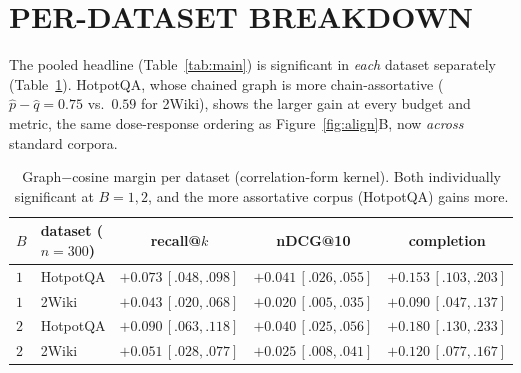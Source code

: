 \documentclass[twoside]{article}
\theoremstyle{plain}
\theoremstyle{definition}
\begin{document}
\section{PER-DATASET BREAKDOWN}\label{app:perds}
The pooled headline (Table~\ref{tab:main}) is significant in \emph{each} dataset separately (Table~\ref{tab:perds}).
HotpotQA, whose chained graph is more chain-assortative ($\hat p-\hat q=0.75$ vs.\ $0.59$ for 2Wiki), shows the
larger gain at every budget and metric, the same dose-response ordering as Figure~\ref{fig:align}B, now
\emph{across} standard corpora.
\begin{table}[h]\caption{Graph$-$cosine margin per dataset (correlation-form kernel). Both individually significant
at $B{=}1,2$, and the more assortative corpus (HotpotQA) gains more.}\label{tab:perds}
\begin{center}\small
\begin{tabular}{llccc}
\toprule
$B$ & dataset ($n{=}300$) & recall@$k$ & nDCG@10 & completion \\ \midrule
$1$ & HotpotQA & $+0.073\,[.048,.098]$ & $+0.041\,[.026,.055]$ & $+0.153\,[.103,.203]$ \\
$1$ & 2Wiki    & $+0.043\,[.020,.068]$ & $+0.020\,[.005,.035]$ & $+0.090\,[.047,.137]$ \\
$2$ & HotpotQA & $+0.090\,[.063,.118]$ & $+0.040\,[.025,.056]$ & $+0.180\,[.130,.233]$ \\
$2$ & 2Wiki    & $+0.051\,[.028,.077]$ & $+0.025\,[.008,.041]$ & $+0.120\,[.077,.167]$ \\
\bottomrule
\end{tabular}
\end{center}
\end{table}
\end{document}
